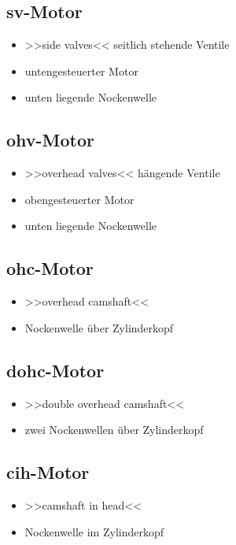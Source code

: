 \subsection{sv-Motor}\label{sv-motor}

\begin{itemize}
\item
  >>side valves<< seitlich stehende Ventile
\item
  untengesteuerter Motor
\item
  unten liegende Nockenwelle
\end{itemize}

\subsection{ohv-Motor}\label{ohv-motor}

\begin{itemize}
\item
  >>overhead valves<< hängende Ventile
\item
  obengesteuerter Motor
\item
  unten liegende Nockenwelle
\end{itemize}

\subsection{ohc-Motor}\label{ohc-motor}

\begin{itemize}
\item
  >>overhead camshaft<<
\item
  Nockenwelle über Zylinderkopf
\end{itemize}

\subsection{dohc-Motor}\label{dohc-motor}

\begin{itemize}
\item
  >>double overhead camshaft<<
\item
  zwei Nockenwellen über Zylinderkopf
\end{itemize}

\subsection{cih-Motor}\label{cih-motor}

\begin{itemize}
\item
  >>camshaft in head<<
\item
  Nockenwelle im Zylinderkopf
\end{itemize}

